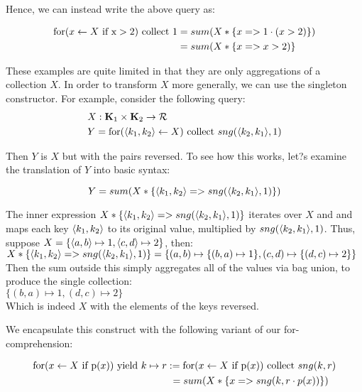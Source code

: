 {{{Hence, we can instead write the above query as:

\begin{equation*}
\begin{split}
 \textrm{for}(x \leftarrow X \textrm{ if x} > 2) \textrm{ collect } 1 &= sum(X * \{x => 1 \cdot (x > 2) \}) \\
 &=sum(X * \{x => x > 2) \}
 \end{split}
 \end{equation*}
 
These examples are quite limited in that they are only aggregations of a collection $X$. In order to transform $X$ more generally, we can use the singleton constructor. For example, consider the following query:
\begin{equation*}
\begin{split}
&X: \mathbf{K}_1 \times \mathbf{K}_2 \rightarrow \mathcal{R} \\
&Y = \textrm{for}(\langle k_1, k_2 \rangle \leftarrow X) \textrm{ collect } sng(\langle k_2, k_1 \rangle, 1)
\end{split}
\end{equation*}

 Then $Y$ is $X$ but with the pairs reversed. To see how this works, let?s examine the translation of $Y$ into basic syntax:
 
\[ Y = sum(X*\{\langle k_1, k_2 \rangle => sng(\langle k_2, k_1 \rangle,1)\}) \]

The inner expression $X*\{\langle k_1, k_2 \rangle => sng(\langle k_2, k_1 \rangle,1)\}$ iterates over $X$ and and maps each key $\langle k_1, k_2 \rangle$ to its original value, multiplied by $sng(\langle k_2, k_1 \rangle,1)$. Thus, suppose $X = \{\langle a, b \rangle \mapsto 1, \langle c, d \rangle \mapsto 2\}$, then: \\

$X*\{\langle k_1, k_2 \rangle => sng(\langle k_2, k_1 \rangle,1)\} = \{(a,b) \mapsto \{(b,a) \mapsto 1\}, (c,d) \mapsto \{(d,c) \mapsto 2\}\}$ \\

Then the sum outside this simply aggregates all of the values via bag union, to produce the single collection: \\

$\{(b,a) \mapsto 1, (d,c) \mapsto 2\}$ \\

Which is indeed $X$ with the elements of the keys reversed.

We encapsulate this construct with the following variant of our for-comprehension: 

\begin{equation*}
\begin{split}
\textrm{for}(x \leftarrow X \textrm{ if p}(x)) \textrm{ yield } k \mapsto r &:= \textrm{for}(x \leftarrow X \textrm{ if p}(x)) \textrm{ collect } sng(k,r) \\
& \ = sum(X * \{x => sng(k,r \cdot p(x)) \})
\end{split}
\end{equation*}

}}}
